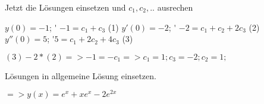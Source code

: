 \documentclass[a4paper, 11pt]{article}
\begin{document}
Jetzt die Lösungen einsetzen und $ c_1, c_2, .. $ ausrechen \newline

\newline $y(0) = -1 $; \'  $-1 = c_1 + c_3$ (1) \newline
\newline $y'(0) = -2 $; \' $ -2 = c_1 + c_2 + 2 c_3$ (2) \newline
\newline $y''(0) = 5  $; \'$  5 = c_1 + 2 c_2 + 4 c_3$ (3) \newline

\newline $(3) - 2*(2) => -1 = - c_1 => c_1 = 1; c_3 = -2; c_2 = 1;$\newline

Lösungen in allgemeine Lösung einsetzen. \newline

\newline $=> y(x) = e^x + xe^x - 2 e^{2 x}$
\end{document}
